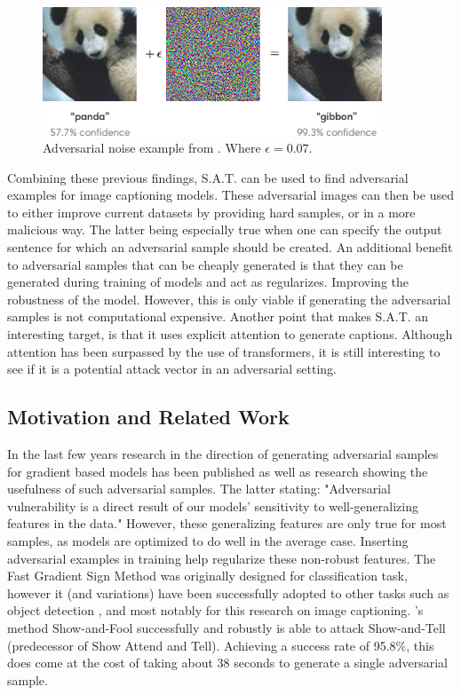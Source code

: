\begin{figure}[h]
    \centering
    \includegraphics[width=0.9\textwidth]{figures/adversarial_img_1.png}
    \caption{Adversarial noise example from \protect\cite{goodfellow2015explaining}. Where $\epsilon=0.07$.}
    \label{adv_gibbon}
\end{figure}

Combining these previous findings, S.A.T. can be used to find adversarial examples for image captioning models. These adversarial images can then be used to either improve current datasets by providing hard samples, or in a more malicious way. The latter being especially true when one can specify the output sentence for which an adversarial sample should be created. An additional benefit to adversarial samples that can be cheaply generated is that they can be generated during training of models and act as regularizes. Improving the robustness of the model. However, this is only viable if generating the adversarial samples is not computational expensive. Another point that makes S.A.T. an interesting target, is that it uses explicit attention to generate captions. Although attention has been surpassed by the use of transformers, it is still interesting to see if it is a potential attack vector in an adversarial setting.

\subsection{Motivation and Related Work}
In the last few years research in the direction of generating adversarial samples for gradient based models has been published \cite{goodfellow2015explaining,Kurakin} as well as research showing the usefulness of such adversarial samples\cite{Ilyas2019features}. The latter stating: "Adversarial vulnerability is a direct result of our models' sensitivity to well-generalizing features in the data." However, these generalizing features are only true for most samples, as models are optimized to do well in the average case. Inserting adversarial examples in training help regularize these non-robust features\cite{https://doi.org/10.48550/arxiv.1611.01236}. The Fast Gradient Sign Method was originally designed for classification task, however it (and variations) have been successfully adopted to other tasks such as object detection \cite{AdversarialAttacksOnFace,AdversarialFasterRCNN,DBLP:journals/corr/abs-1907-10310}, and most notably for this research on image captioning\cite{Hongge}. \citeauthor{Hongge}'s method Show-and-Fool successfully and robustly is able to attack Show-and-Tell\cite{showandtell} (predecessor of Show Attend and Tell). Achieving a success rate of 95.8\%, this does come at the cost of taking about 38 seconds to generate a single adversarial sample.

